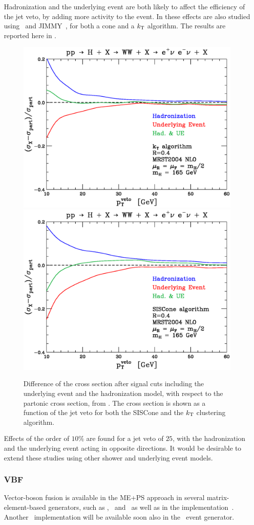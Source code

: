Hadronization and the underlying event are both likely to affect the
efficiency of the jet veto, by adding more activity to the event.
In  these effects are also
studied using \herwig\ and {\sc JIMMY}~\cite{Butterworth:1996zw}, for both a cone and 
a $k_{\mathrm{T}}$ algorithm.
The results are reported here in .
\begin{figure}[htb]
\centering
\includegraphics[width=.48\linewidth]{YRHXS_NLOMC/YRHXS_NLOMC_fig5.ps}
\includegraphics[width=.48\linewidth]{YRHXS_NLOMC/YRHXS_NLOMC_fig6.ps}
\caption{ %
Difference of the cross section after signal cuts including the underlying
event and the hadronization model, with respect to the partonic cross section,
from .
The cross section is shown as a function of the jet veto for both the
SISCone and the $k_{\mathrm{T}}$ clustering algorithm.}
\label{fig:UEeffect}
\end{figure}
Effects of the order of $10\%$ are found for a jet veto of $25$\UGeV,
with the hadronization and the underlying event acting in opposite directions.
It would be desirable to extend these studies using other shower and
underlying event models.

\subsubsection{VBF}

Vector-boson fusion is available in the ME+PS approach in several matrix-element-based 
generators, such as \alpgen, \MGME\ and \sherpa\ as well as in 
the \POWHEGBOX{} implementation~\cite{Nason:2009ai}.   Another \POWHEG\
implementation will be available soon also in the \herwigpp\ event generator.

